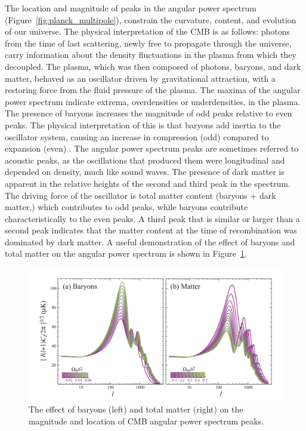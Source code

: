 The location and magnitude of peaks in the angular power spectrum (Figure~\ref{fig:planck_multipole}), constrain the curvature, content, and evolution of our universe. The physical interpretation of the \ac{CMB} is as follows: photons from the time of last scattering, newly free to propagate through the universe, carry information about the density fluctuations in the plasma from which they decoupled. The plasma, which was then composed of photons, baryons, and dark matter, behaved as an oscillator driven by gravitational attraction, with a restoring force from the fluid pressure of the plasma. The maxima of the angular power spectrum indicate extrema, overdensities or underdensities, in the plasma. The presence of baryons increases the magnitude of odd peaks relative to even peaks. The physical interpretation of this is that baryons add inertia to the oscillator system, causing an increase in compression (odd) compared to expansion (even) \cite{Hu2008}. The angular power spectrum peaks are sometimes referred to acoustic peaks, as the oscillations that produced them were longitudinal and depended on density, much like sound waves. The presence of dark matter is apparent in the relative heights of the second and third peak in the spectrum. The driving force of the oscillator is total matter content (baryons + dark matter,) which contributes to odd peaks, while baryons contribute characteristically to the even peaks. A third peak that is similar or larger than a second peak indicates that the matter content at the time of recombination was dominated by dark matter. A useful demonstration of the effect of baryons and total matter on the angular power spectrum is shown in Figure~\ref{fig:matter_baryons}.

\begin{figure}[htbp]
\begin{center}
\includegraphics[width=\textwidth]{figures/theory/matter_baryons.png}
\caption{The effect of baryons (left) and total matter (right) on the magnitude and location of \ac{CMB} angular power spectrum peaks.  \cite{Hu2008} }
\label{fig:matter_baryons}
\end{center}
\end{figure}


